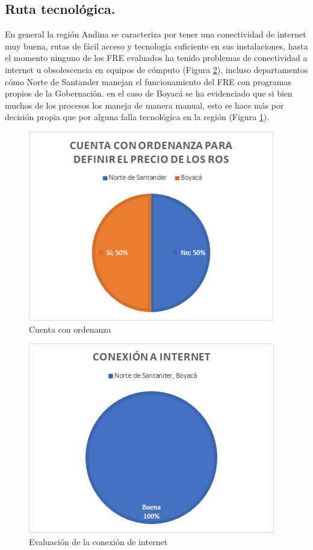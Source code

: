 \documentclass[
]{book}
\begin{document}
\hypertarget{ruta-tecnoluxf3gica.}{%
\subsection{Ruta tecnológica.}\label{ruta-tecnoluxf3gica.}}

En general la región Andina se caracteriza por tener una conectividad de internet muy buena, rutas de fácil acceso y tecnología suficiente en sus instalaciones, hasta el momento ninguno de los FRE evaluados ha tenido problemas de conectividad a internet u obsolescencia en equipos de cómputo (Figura \ref{fig:ConexionInternetRecRegAndinaNorte}), incluso departamentos cómo Norte de Santander manejan el funcionamiento del FRE con programas propios de la Gobernación. en el caso de Boyacá se ha evidenciado que si bien muchos de los procesos los maneja de manera manual, esto se hace más por decisión propia que por alguna falla tecnológica en la región (Figura \ref{fig:CuentasOrdenanza1}).

\begin{figure}
\includegraphics[width=0.85\linewidth]{figures/Imagen5} \caption{Cuenta con ordenanza}\label{fig:CuentasOrdenanza1}
\end{figure}

\begin{figure}
\includegraphics[width=0.85\linewidth]{figures/Imagen6} \caption{Evaluación de la conexión de internet}\label{fig:ConexionInternetRecRegAndinaNorte}
\end{figure}
\end{document}
